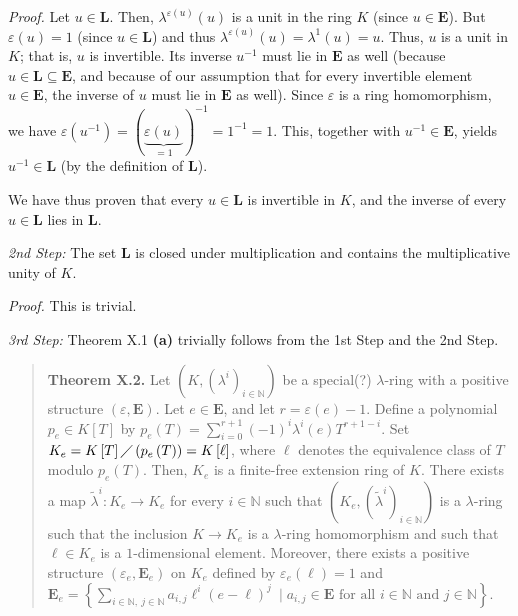 \documentclass[numbers=enddot,12pt,final,onecolumn,notitlepage]{scrartcl}%
\begin{document}
\textit{Proof.} Let $u\in\mathbf{L}$. Then, $\lambda^{\varepsilon\left(
u\right)  }\left(  u\right)  $ is a unit in the ring $K$ (since $u\in
\mathbf{E}$). But $\varepsilon\left(  u\right)  =1$ (since $u\in\mathbf{L}$)
and thus $\lambda^{\varepsilon\left(  u\right)  }\left(  u\right)
=\lambda^{1}\left(  u\right)  =u$. Thus, $u$ is a unit in $K$; that is, $u$ is
invertible. Its inverse $u^{-1}$ must lie in $\mathbf{E}$ as well (because
$u\in\mathbf{L}\subseteq\mathbf{E}$, and because of our assumption that for
every invertible element $u\in\mathbf{E}$, the inverse of $u$ must lie in
$\mathbf{E}$ as well). Since $\varepsilon$ is a ring homomorphism, we have
$\varepsilon\left(  u^{-1}\right)  =\left(  \underbrace{\varepsilon\left(
u\right)  }_{=1}\right)  ^{-1}=1^{-1}=1$. This, together with $u^{-1}%
\in\mathbf{E}$, yields $u^{-1}\in\mathbf{L}$ (by the definition of
$\mathbf{L}$).

We have thus proven that every $u\in\mathbf{L}$ is invertible in $K$, and the
inverse of every $u\in\mathbf{L}$ lies in $\mathbf{L}$.

\textit{2nd Step:} The set $\mathbf{L}$ is closed under multiplication and
contains the multiplicative unity of $K$.

\textit{Proof.} This is trivial.

\textit{3rd Step:} Theorem X.1 \textbf{(a)} trivially follows from the 1st
Step and the 2nd Step.

\begin{quote}
\textbf{Theorem X.2.} Let $\left(  K,\left(  \lambda^{i}\right)
_{i\in\mathbb{N}}\right)  $ be a special(?) $\lambda$-ring with a positive
structure $\left(  \varepsilon,\mathbf{E}\right)  $. Let $e\in\mathbf{E}$, and
let $r=\varepsilon\left(  e\right)  -1$. Define a polynomial $p_{e}\in
K\left[  T\right]  $ by $p_{e}\left(  T\right)  =\sum\limits_{i=0}%
^{r+1}\left(  -1\right)  ^{i}\lambda^{i}\left(  e\right)  T^{r+1-i}$. Set
$K_{e}=K\left[  T\right]  \diagup\left(  p_{e}\left(  T\right)  \right)
=K\left[  \ell\right]  $, where $\ell$ denotes the equivalence class of $T$
modulo $p_{e}\left(  T\right)  $. Then, $K_{e}$ is a finite-free extension
ring of $K$. There exists a map $\widetilde{\lambda}^{i}:K_{e}\rightarrow
K_{e}$ for every $i\in\mathbb{N}$ such that $\left(  K_{e},\left(
\widetilde{\lambda}^{i}\right)  _{i\in\mathbb{N}}\right)  $ is a $\lambda
$-ring such that the inclusion $K\rightarrow K_{e}$ is a $\lambda$-ring
homomorphism and such that $\ell\in K_{e}$ is a $1$-dimensional element.
Moreover, there exists a positive structure $\left(  \varepsilon
_{e},\mathbf{E}_{e}\right)  $ on $K_{e}$ defined by $\varepsilon_{e}\left(
\ell\right)  =1$ and $\mathbf{E}_{e}=\left\{  \sum\limits_{i\in\mathbb{N}%
,\ j\in\mathbb{N}}a_{i,j}\ell^{i}\left(  e-\ell\right)  ^{j}\ \mid\text{
}a_{i,j}\in\mathbf{E}\text{ for all }i\in\mathbb{N}\text{ and }j\in
\mathbb{N}\right\}  .$
\end{quote}
\end{document}
